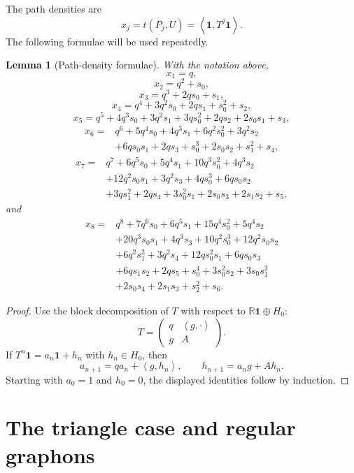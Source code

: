 \documentclass[11pt]{article}
\newtheorem{lemma}[theorem]{Lemma}
\newcommand{\one}{\mathbf 1}
\newcommand{\ip}[2]{\left\langle #1,#2\right\rangle}
\begin{document}
The path densities are
\[
        x_j=t(P_j,U)=\ip{\one}{T^j\one}.
\]
The following formulae will be used repeatedly.

\begin{lemma}[Path-density formulae]\label{lem:path-formulae}
With the notation above,
\[
        x_1=q,
\]
\[
        x_2=q^2+s_0,
\]
\[
        x_3=q^3+2qs_0+s_1,
\]
\[
        x_4=q^4+3q^2s_0+2qs_1+s_0^2+s_2,
\]
\[
        x_5=q^5+4q^3s_0+3q^2s_1+3qs_0^2+2qs_2+2s_0s_1+s_3,
\]
\[
\begin{aligned}
        x_6={}&q^6+5q^4s_0+4q^3s_1+6q^2s_0^2+3q^2s_2\\
        &+6qs_0s_1+2qs_3+s_0^3+2s_0s_2+s_1^2+s_4,
\end{aligned}
\]
\[
\begin{aligned}
        x_7={}&q^7+6q^5s_0+5q^4s_1+10q^3s_0^2+4q^3s_2\\
        &+12q^2s_0s_1+3q^2s_3+4qs_0^3+6qs_0s_2\\
        &+3qs_1^2+2qs_4+3s_0^2s_1+2s_0s_3+2s_1s_2+s_5,
\end{aligned}
\]
and
\[
\begin{aligned}
        x_8={}&q^8+7q^6s_0+6q^5s_1+15q^4s_0^2+5q^4s_2\\
        &+20q^3s_0s_1+4q^3s_3+10q^2s_0^3+12q^2s_0s_2\\
        &+6q^2s_1^2+3q^2s_4+12qs_0^2s_1+6qs_0s_3\\
        &+6qs_1s_2+2qs_5+s_0^4+3s_0^2s_2+3s_0s_1^2\\
        &+2s_0s_4+2s_1s_3+s_2^2+s_6.
\end{aligned}
\]
\end{lemma}

\begin{proof}
Use the block decomposition of $T$ with respect to $\mathbb R\one\oplus H_0$:
\[
        T=\begin{pmatrix}
            q & \ip{g}{\cdot}\\
            g & A
        \end{pmatrix}.
\]
If $T^n\one=a_n\one+h_n$ with $h_n\in H_0$, then
\[
        a_{n+1}=qa_n+\ip{g}{h_n},
        \qquad
        h_{n+1}=a_ng+Ah_n.
\]
Starting with $a_0=1$ and $h_0=0$, the displayed identities follow by induction.
\end{proof}

\section{The triangle case and regular graphons}
\end{document}
